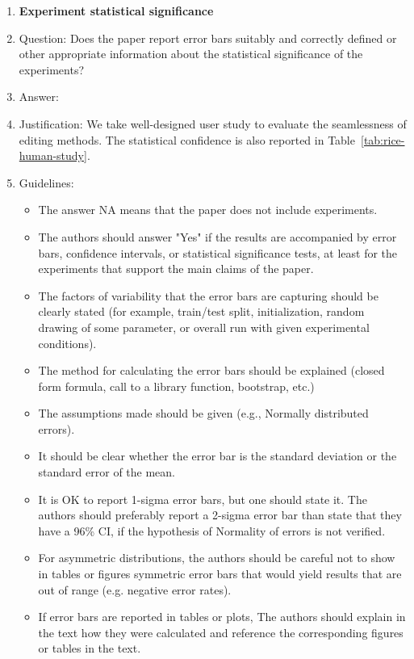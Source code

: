 \documentclass{article}
\begin{document}
\begin{enumerate}
\item {\bf Experiment statistical significance}
    \item[] Question: Does the paper report error bars suitably and correctly defined or other appropriate information about the statistical significance of the experiments?
    \item[] Answer: \answerYes{} %
    \item[] Justification: We take well-designed user study to evaluate the seamlessness of editing methods. The statistical confidence is also reported in Table~\ref{tab:rice-human-study}.
    \item[] Guidelines:
    \begin{itemize}
        \item The answer NA means that the paper does not include experiments.
        \item The authors should answer "Yes" if the results are accompanied by error bars, confidence intervals, or statistical significance tests, at least for the experiments that support the main claims of the paper.
        \item The factors of variability that the error bars are capturing should be clearly stated (for example, train/test split, initialization, random drawing of some parameter, or overall run with given experimental conditions).
        \item The method for calculating the error bars should be explained (closed form formula, call to a library function, bootstrap, etc.)
        \item The assumptions made should be given (e.g., Normally distributed errors).
        \item It should be clear whether the error bar is the standard deviation or the standard error of the mean.
        \item It is OK to report 1-sigma error bars, but one should state it. The authors should preferably report a 2-sigma error bar than state that they have a 96\% CI, if the hypothesis of Normality of errors is not verified.
        \item For asymmetric distributions, the authors should be careful not to show in tables or figures symmetric error bars that would yield results that are out of range (e.g. negative error rates).
        \item If error bars are reported in tables or plots, The authors should explain in the text how they were calculated and reference the corresponding figures or tables in the text.
    \end{itemize}


\end{enumerate}
\end{document}
